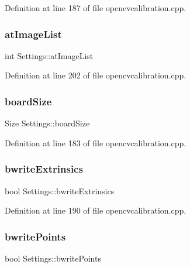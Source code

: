 Definition at line 187 of file opencvcalibration.\+cpp.

\mbox{\label{class_settings_a80061aedf354e63cb6c4c1fb7c4a9055}} 
\subsubsection{\texorpdfstring{atImageList}{atImageList}}
{\footnotesize\ttfamily int Settings\+::at\+Image\+List}



Definition at line 202 of file opencvcalibration.\+cpp.

\mbox{\label{class_settings_a5030a7164df923bb3b86dd7a0fc9af30}} 
\subsubsection{\texorpdfstring{boardSize}{boardSize}}
{\footnotesize\ttfamily Size Settings\+::board\+Size}



Definition at line 183 of file opencvcalibration.\+cpp.

\mbox{\label{class_settings_af1ac412d660e25aea698c76fa88de57c}} 
\subsubsection{\texorpdfstring{bwriteExtrinsics}{bwriteExtrinsics}}
{\footnotesize\ttfamily bool Settings\+::bwrite\+Extrinsics}



Definition at line 190 of file opencvcalibration.\+cpp.

\mbox{\label{class_settings_ab4aac97bdb5696d60b35a29c26497064}} 
\subsubsection{\texorpdfstring{bwritePoints}{bwritePoints}}
{\footnotesize\ttfamily bool Settings\+::bwrite\+Points}



